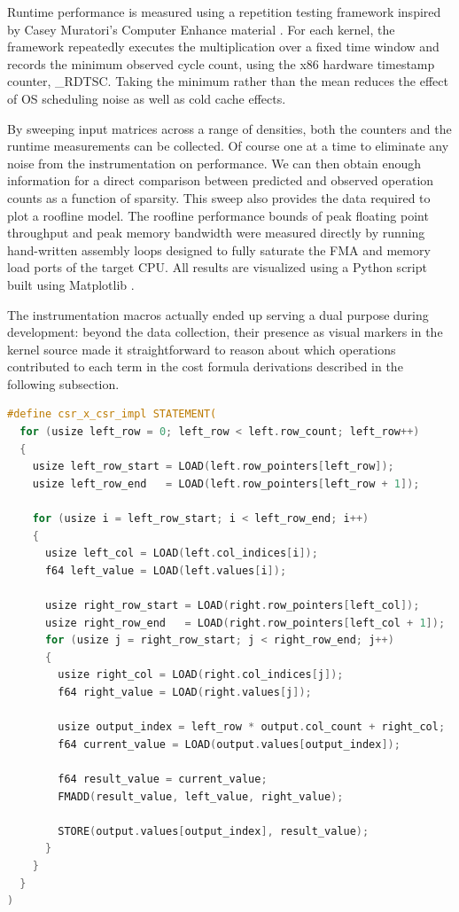Runtime performance is measured using a repetition testing framework inspired by Casey Muratori's Computer Enhance material \cite{muratori}. For each kernel, the framework repeatedly executes the multiplication over a fixed time window and records the minimum observed cycle count, using the x86 hardware timestamp counter, \_RDTSC. Taking the minimum rather than the mean reduces the effect of OS scheduling noise as well as cold cache effects.

By sweeping input matrices across a range of densities, both the counters and the runtime measurements can be collected. Of course one at a time to eliminate any noise from the instrumentation on performance. We can then obtain enough information for a direct comparison between predicted and observed operation counts as a function of sparsity. This sweep also provides the data required to plot a roofline model. The roofline performance bounds of peak floating point throughput and peak memory bandwidth were measured directly by running hand-written assembly loops designed to fully saturate the FMA and memory load ports of the target CPU. All results are visualized using a Python script built using Matplotlib \cite{matplotlib}.

The instrumentation macros actually ended up serving a dual purpose during development: beyond the data collection, their presence as visual markers in the kernel source made it straightforward to reason about which operations contributed to each term in the cost formula derivations described in the following subsection.

\begin{lstlisting}[float, language=C, caption={Implementation macro example, backslashes ommitted for formatting, STATEMENT expands to a do while(0)}]
#define csr_x_csr_impl STATEMENT(
  for (usize left_row = 0; left_row < left.row_count; left_row++)
  {
    usize left_row_start = LOAD(left.row_pointers[left_row]);
    usize left_row_end   = LOAD(left.row_pointers[left_row + 1]);

    for (usize i = left_row_start; i < left_row_end; i++)
    {
      usize left_col = LOAD(left.col_indices[i]);
      f64 left_value = LOAD(left.values[i]);

      usize right_row_start = LOAD(right.row_pointers[left_col]);
      usize right_row_end   = LOAD(right.row_pointers[left_col + 1]);
      for (usize j = right_row_start; j < right_row_end; j++)
      {
        usize right_col = LOAD(right.col_indices[j]);
        f64 right_value = LOAD(right.values[j]);

        usize output_index = left_row * output.col_count + right_col;
        f64 current_value = LOAD(output.values[output_index]);

        f64 result_value = current_value;
        FMADD(result_value, left_value, right_value);

        STORE(output.values[output_index], result_value);
      }
    }
  }
)
\end{lstlisting}

